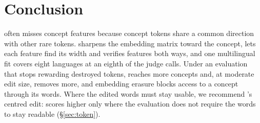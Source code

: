 \section{Conclusion}
\label{sec:conclusion}

\ember{} often misses concept features because concept tokens share a common direction with other rare tokens.
\cinder{} sharpens the embedding matrix toward the concept, lets each feature find its width and verifies features both ways, and one multilingual fit covers eight languages at an eighth of the judge calls.
Under an evaluation that stops rewarding destroyed tokens, \cinder{} reaches more concepts and, at moderate edit size, removes more, and embedding erasure blocks access to a concept through its words.
Where the edited words must stay usable, we recommend \cinder{}'s centred edit: \cinderz{} scores higher only where the evaluation does not require the words to stay readable (\S\ref{sec:token}).
